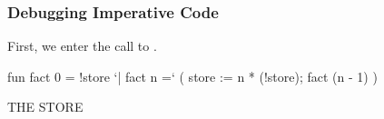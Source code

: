 \documentclass[aspectratio=169, handout]{beamer}
\begin{document}
\begin{frame}[fragile]
  \frametitle{Debugging Imperative Code}

  \begin{minipage}[t][0.6in][t]{\textwidth}
  First, we enter the call to .
  \end{minipage}

  \vspace{10pt}

  \begin{center}
    \begin{minipage}[t][1.7in][t]{0.6\textwidth}
      \vspace{\fill}
      \begin{codeblock}
        fun fact 0 = !store
          `| fact n =`
              ( store := n * (!store);
                fact (n - 1)
              )
      \end{codeblock}
      \vspace{\fill}
    \end{minipage}
    \hfill\vline\hfill
    \begin{minipage}[t][1.7in][t]{0.3\textwidth}
      \centering
      {\hspace{-20pt}\color{gray} \large THE STORE}

      \vspace{\fill}
      \vspace{\fill}
    \end{minipage}
  \end{center}
\end{frame}
\end{document}

